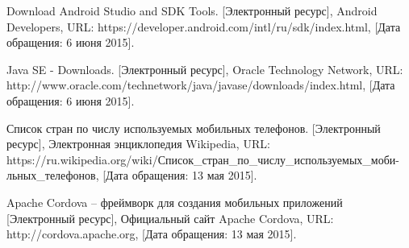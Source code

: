 \begin{thebibliography}{30}
 Download Android Studio and SDK Tools. [Электронный ресурс], Android Developers, URL: https://developer.android.com/intl/ru/sdk/index.html, [Дата обращения: 6 июня 2015].

 Java SE - Downloads. [Электронный ресурс], Oracle Technology Network, URL: http://www.oracle.com/technetwork/java/javase/downloads/index.html, [Дата обращения: 6 июня 2015].

 Список стран по числу используемых мобильных телефонов. [Электронный ресурс], Электронная энциклопедия Wikipedia, URL: https://ru.wikipedia.org/wiki/Список\_стран\_по\_числу\_используемых\_моби- льных\_телефонов, [Дата обращения: 13 мая 2015].

 Apache Cordova – фреймворк для создания мобильных приложений [Электронный ресурс], Официальный сайт Apache Cordova, URL: http://cordova.apache.org, [Дата обращения: 13 мая 2015].


\end{thebibliography}
